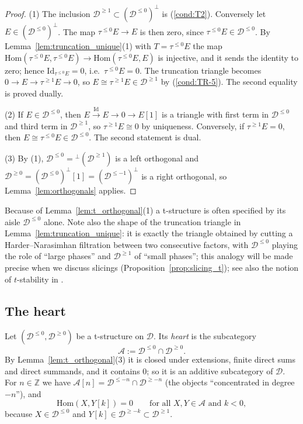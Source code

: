 \documentclass[12pt]{amsart}
\newcommand{\condref}[1]{\textup{(\ref{#1})}}
\newenvironment{remark}{{\textbf{Remark.}}}
\numberwithin{theorem}{section}
\theoremstyle{definition}
\newcommand{\ZZ}{\mathbb{Z}}
\newcommand{\calA}{\mathcal{A}}
\newcommand{\Hom}{\mathrm{Hom}}
\newcommand{\id}{\mathrm{Id}}
\newcommand{\calD}{\mathcal{D}}
\newcommand{\Dle}[1]{\calD^{\leqslant #1}}
\newcommand{\Dge}[1]{\calD^{\geqslant #1}}
\begin{document}
	\begin{proof}
		(1) The inclusion $\Dge{1} \subset (\Dle{0})^{\perp}$ is \condref{cond:T2}.
		Conversely let $E \in (\Dle{0})^{\perp}$.
		The map $\tau^{\leqslant 0} E \to E$ is then zero, since $\tau^{\leqslant 0} E \in \Dle{0}$.
		By Lemma~\ref{lem:truncation_unique}(1) with $T = \tau^{\leqslant 0} E$ the map $\Hom(\tau^{\leqslant 0} E, \tau^{\leqslant 0} E) \to \Hom(\tau^{\leqslant 0} E, E)$ is injective, and it sends the identity to zero;
		hence $\id_{\tau^{\leqslant 0} E} = 0$, i.e.\ $\tau^{\leqslant 0} E = 0$.
		The truncation triangle becomes $0 \to E \to \tau^{\geqslant 1} E \to 0$, so $E \cong \tau^{\geqslant 1} E \in \Dge{1}$ by \condref{cond:TR-5}.
		The second equality is proved dually.
		
		(2) If $E \in \Dle{0}$, then $E \xrightarrow{\id} E \to 0 \to E[1]$ is a triangle with first term in $\Dle{0}$ and third term in $\Dge{1}$, so $\tau^{\geqslant 1} E \cong 0$ by uniqueness.
		Conversely, if $\tau^{\geqslant 1} E = 0$, then $E \cong \tau^{\leqslant 0} E \in \Dle{0}$.
		The second statement is dual.
		
		(3) By (1), $\Dle{0} = {}^{\perp}(\Dge{1})$ is a left orthogonal and $\Dge{0} = (\Dle{0})^{\perp}[1] = (\Dle{-1})^{\perp}$ is a right orthogonal, so Lemma~\ref{lem:orthogonals} applies.
	\end{proof}
	
	\begin{remark}
		Because of Lemma~\ref{lem:t_orthogonal}(1) a t-structure is often specified by its aisle $\Dle{0}$ alone.
		Note also the shape of the truncation triangle in Lemma~\ref{lem:truncation_unique}: it is exactly the triangle obtained by cutting a Harder--Narasimhan filtration between two consecutive factors, with $\Dle{0}$ playing the role of ``large phases'' and $\Dge{1}$ of ``small phases'';
		this analogy will be made precise when we discuss slicings (Proposition~\ref{prop:slicing_t}); see also the notion of $t$-stability in \cite{GKR04}.
	\end{remark}
	
	\subsection{The heart}
	
	Let $(\Dle{0}, \Dge{0})$ be a t-structure on $\calD$.
	Its \emph{heart} is the subcategory
	\[
	\calA := \Dle{0} \cap \Dge{0} .
	\]
	By Lemma~\ref{lem:t_orthogonal}(3) it is closed under extensions, finite direct sums and direct summands, and it contains $0$;
	so it is an additive subcategory of $\calD$.
	For $n \in \ZZ$ we have $\calA[n] = \Dle{-n} \cap \Dge{-n}$ (the objects ``concentrated in degree $-n$''), and
	\begin{equation}
		\label{eq:heart_negative_ext}
		\Hom(X, Y[k]) = 0 \qquad \text{for all } X, Y \in \calA \text{ and } k < 0,
	\end{equation}
	because $X \in \Dle{0}$ and $Y[k] \in \Dge{-k} \subset \Dge{1}$.
	
\end{document}
